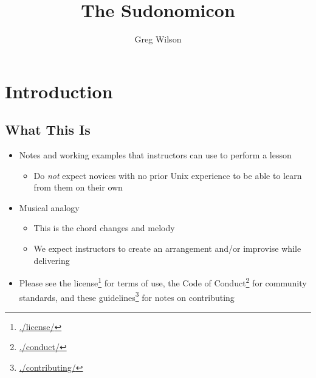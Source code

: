 \documentclass[krantzl]{krantz}
\newcommand{\hreffoot}[2]{{#1}\footnote{\href{#2}{#2}}}
\begin{document}
\title{The Sudonomicon}
\author{Greg Wilson}
\maketitle

\tableofcontents

\mainmatter
\chapter{Introduction}\label{intro}



\section{What This Is}
\begin{itemize}
\item Notes and working examples that instructors can use to perform a lesson\begin{itemize}
\item Do \emph{not} expect novices with no prior Unix experience to be able to learn from them on their own

\end{itemize}


\item Musical analogy\begin{itemize}
\item This is the chord changes and melody

\item We expect instructors to create an arrangement and/or improvise while delivering

\end{itemize}


\item Please see \hreffoot{the license}{./license/} for terms of use,
    the \hreffoot{Code of Conduct}{./conduct/} for community standards,
    and \hreffoot{these guidelines}{./contributing/} for notes on contributing

\end{itemize}
\end{document}
